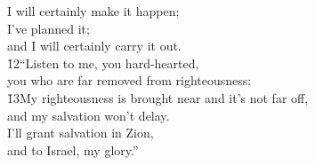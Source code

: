 \begin{poetry}
\poemll    I will certainly make it happen; \\
\poeml I've planned it; \\
\poemll    and I will certainly carry it out. \\
\poeml \v{12}``Listen to me, you hard-hearted, \\
\poemll    you who are far removed from righteousness: \\
\poeml \v{13}My righteousness is brought near and it's not far off, \\
\poemll    and my salvation won't delay. \\
\poeml I'll grant salvation in Zion, \\
\poemll    and to Israel, my glory.''
\end{poetry}


